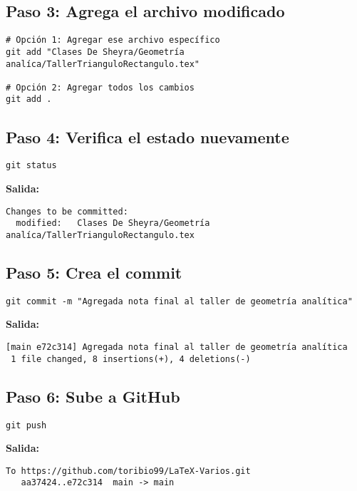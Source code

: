 \documentclass[11pt,a4paper]{article}
\begin{document}
\subsection{Paso 3: Agrega el archivo modificado}

\begin{lstlisting}[style=bashstyle]
# Opción 1: Agregar ese archivo específico
git add "Clases De Sheyra/Geometría analíca/TallerTrianguloRectangulo.tex"

# Opción 2: Agregar todos los cambios
git add .
\end{lstlisting}

\subsection{Paso 4: Verifica el estado nuevamente}

\begin{lstlisting}[style=bashstyle]
git status
\end{lstlisting}

\textbf{Salida:}
\begin{lstlisting}[style=bashstyle]
Changes to be committed:
  modified:   Clases De Sheyra/Geometría analíca/TallerTrianguloRectangulo.tex
\end{lstlisting}

\subsection{Paso 5: Crea el commit}

\begin{lstlisting}[style=bashstyle]
git commit -m "Agregada nota final al taller de geometría analítica"
\end{lstlisting}

\textbf{Salida:}
\begin{lstlisting}[style=bashstyle]
[main e72c314] Agregada nota final al taller de geometría analítica
 1 file changed, 8 insertions(+), 4 deletions(-)
\end{lstlisting}

\subsection{Paso 6: Sube a GitHub}

\begin{lstlisting}[style=bashstyle]
git push
\end{lstlisting}

\textbf{Salida:}
\begin{lstlisting}[style=bashstyle]
To https://github.com/toribio99/LaTeX-Varios.git
   aa37424..e72c314  main -> main
\end{lstlisting}
\end{document}
